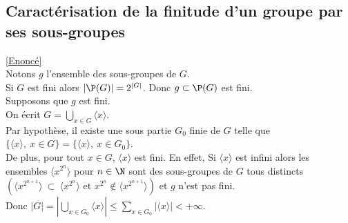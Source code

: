 \documentclass[8pt]{book}
\begin{document}
	\subsection{Caractérisation de la finitude d'un groupe par ses sous-groupes }
	\label{Caractérisation de la finitude d'un groupe par ses sous-groupes corrigé}
	\textcolor{blue}{\hyperref[Caractérisation de la finitude d'un groupe par ses sous-groupes]{[Enoncé]}}\\
	Notons $g$ l'ensemble des sous-groupes de $G$.\\
	Si $G$ est fini alors $|\P(G)|=2^{|G|}$. Donc $g\subset \P(G)$ est fini.\\
	Supposons que $g$ est fini.\\
	On écrit $G=\displaystyle\bigcup_{x\in G}\langle x\rangle$.\\
	Par hypothèse, il existe une sous partie $G_0$ finie de $G$ telle que $\{\langle x\rangle,\ x\in G\}=\{\langle x\rangle,\ x\in G_0\}$.\\
	De plus, pour tout $x\in G$, $\langle x\rangle$ est fini. En effet, Si $\langle x\rangle$ est infini alors les ensembles $\langle x^{2^n}\rangle$ pour $n\in \N$ sont des sous-groupes de $G$ tous distincts $\left(\langle x^{2^{n+1}}\rangle\ \subset\ \langle x^{2^n}\rangle\text{ et }x^{2^n}\notin \langle x^{2^{n+1}}\rangle\right)$ et $g$ n'est pas fini.\\
	Donc $|G|=\displaystyle\left|\bigcup_{x\in G_0}\langle x\rangle\right|\leq \sum_{x\in G_0}|\langle x\rangle|<+\infty$.
	
\end{document}
